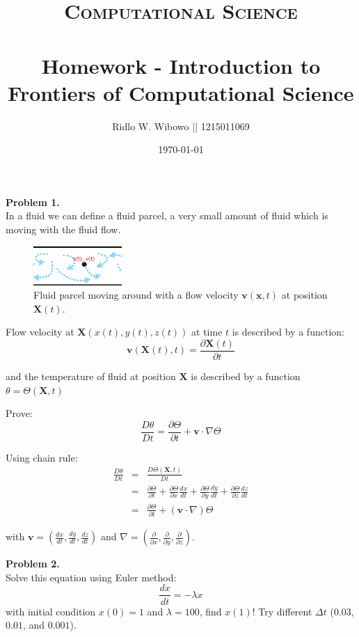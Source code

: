 \documentclass[paper=a4, fontsize=11pt]{scrartcl}
\title{	
\normalfont \normalsize 
\textsc{Computational Science} \\ [25pt] %
\horrule{0.5pt} \\[0.2cm] %
\small Homework - Introduction to Frontiers of Computational Science\\ %
}
\author{\small{Ridlo W. Wibowo || 1215011069}} %
\date{\small\today} %
\numberwithin{equation}{section} %
\numberwithin{figure}{section} %
\numberwithin{table}{section} %
\begin{document}
\maketitle %

\textbf{Problem 1.}\\
In a fluid we can define a fluid parcel, a very small amount of fluid which is moving with the fluid flow.\\
\begin{figure}
	\centering
	\includegraphics[width=0.3\textwidth]{fluid_flow.png}
	\caption{Fluid parcel moving around with a flow velocity $\textbf{v}(\textbf{x},t)$ at position $\textbf{X}(t)$.}
\end{figure}

Flow velocity at $\textbf{X} (x(t), y(t), z(t))$ at time $t$ is described by a function:\\
\begin{equation*}
\textbf{v}(\textbf{X}(t), t) = \frac{\partial \textbf{X}(t)}{\partial t} 
\end{equation*}

and the temperature of fluid at position $\textbf{X}$ is described by a function $\theta = \Theta(\textbf{X},t)$

Prove:
\begin{equation*}
\frac{D\theta}{Dt} = \frac{\partial \Theta}{\partial t} + \textbf{v} \cdot \nabla \Theta
\end{equation*}

Using chain rule:
\begin{eqnarray*}
\frac{D\theta}{Dt} & = & \frac{D \Theta(\textbf{X},t)}{Dt}\\
 & = & \frac{\partial \Theta}{\partial t} + \frac{\partial \Theta}{\partial x} \frac{d x}{d t} + \frac{\partial \Theta}{\partial y} \frac{d y}{d t} + \frac{\partial \Theta}{\partial z} \frac{d z}{d t}\\
 & = & \frac{\partial \Theta}{\partial t} + (\textbf{v} \cdot \nabla) \Theta
\end{eqnarray*}

with $\textbf{v} = (\frac{dx}{dt}, \frac{dy}{dt}, \frac{dz}{dt})$ and $\nabla = (\frac{\partial }{\partial x}, \frac{\partial }{\partial y}, \frac{\partial }{\partial z})$.

\textbf{Problem 2.}\\
Solve this equation using Euler method:
\begin{equation*}
\frac{dx}{dt} = -\lambda x
\end{equation*}
with initial condition $x(0) = 1$ and $\lambda = 100$, find $x(1)$! Try different $\Delta t$ ($0.03$, $0.01$, and $0.001$).
\end{document}
